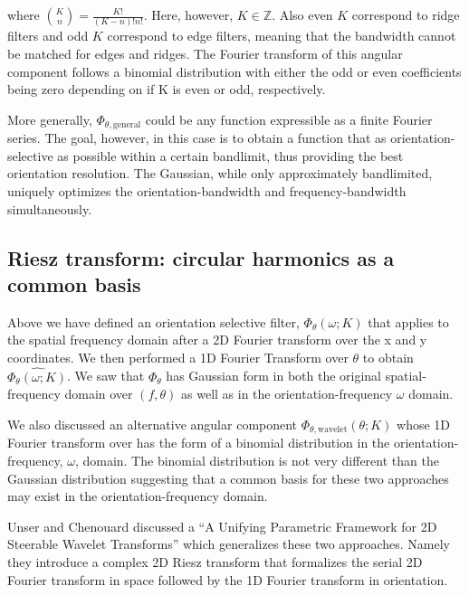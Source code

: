 \documentclass{article}
\begin{document}
where $ {K \choose n} = \frac{K!}{(K-n)!n!} $. Here, however, $ K \in \mathbb{Z} $. Also even $ K $ correspond to ridge filters and odd $ K $ correspond to edge filters, meaning that the bandwidth cannot be matched for edges and ridges. The Fourier transform of this angular component follows a binomial distribution with either the odd or even coefficients being zero depending on if K is even or odd, respectively.

More generally, $ \Phi_{\theta,\mbox{general}} $ could be any function expressible as a finite Fourier series. The goal, however, in this case is to obtain a function that as orientation-selective as possible within a certain bandlimit, thus providing the best orientation resolution. The Gaussian, while only approximately bandlimited, uniquely optimizes the orientation-bandwidth and frequency-bandwidth simultaneously.

\subsection{Riesz transform: circular harmonics as a common basis}

Above we have defined an orientation selective filter, $ \Phi_\theta(\omega; K) $ that applies to the spatial frequency domain after a 2D Fourier transform over the x and y coordinates. We then performed a 1D Fourier Transform over $ \theta $ to obtain $ \widehat{\Phi_\theta(\omega; K)} $. We saw that $ \Phi_\theta $ has Gaussian form in both the original spatial-frequency domain over $ (f,\theta) $ as well as in the orientation-frequency $ \omega $ domain.

We also discussed an alternative angular component $ \Phi_{\theta,\mbox{wavelet}}(\theta; K) $ whose 1D Fourier transform over has the form of a binomial distribution in the orientation-frequency, $ \omega $, domain. The binomial distribution is not very different than the Gaussian distribution suggesting that a common basis for these two approaches may exist in the orientation-frequency domain.

Unser and Chenouard discussed a ``A Unifying Parametric Framework for 2D Steerable Wavelet Transforms'' which generalizes these two approaches. Namely they introduce a complex 2D Riesz transform that formalizes the serial 2D Fourier transform in space followed by the 1D Fourier transform in orientation.
\end{document}

